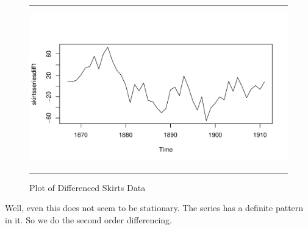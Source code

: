 \documentclass[11pt, letterpaper, twoside]{memoir}\usepackage{knitr}
\begin{document}
\begin{figure}
\centering
\rule{4in}{1pt}
\begin{knitrout}
\color{fgcolor}\begin{kframe}
\begin{alltt}
 \hlkwb{<-}  \hlstd{=}\hlstd{)}
\end{alltt}
\end{kframe}
\includegraphics[width=\maxwidth]{figure/unnamed-chunk-117-1} 

\end{knitrout}
\caption{Plot of Differenced Skirts Data}
\label{Fig:diffskirts}
\rule{4in}{1pt}
\end{figure}

Well, even this does not seem to be stationary. The series has a definite pattern in it. So we do the second order differencing.
\end{document}
